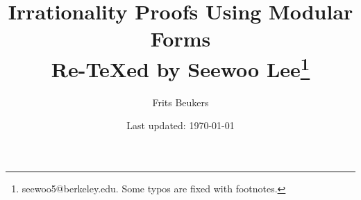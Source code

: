 \documentclass[letterpaper, 12pt]{article}
\begin{document}

\title{Irrationality Proofs Using Modular Forms \\[1em]
\normalsize Re-\TeX ed by Seewoo Lee\footnote{seewoo5@berkeley.edu. Some typos are fixed with footnotes.}}


\author{Frits Beukers}
\date{\normalsize\vspace{-1ex} Last updated: \today}


\maketitle





















\end{document}
